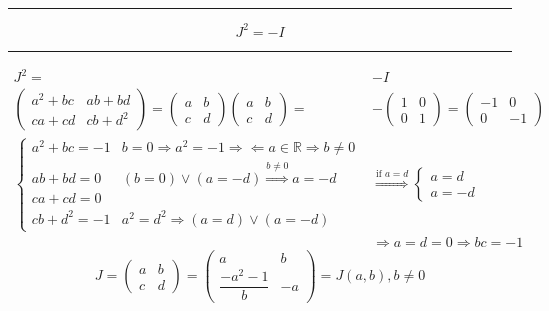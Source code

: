 \documentclass[
]{book}
\theoremstyle{definition}
\theoremstyle{definition}
\theoremstyle{definition}
\theoremstyle{definition}
\theoremstyle{remark}
\begin{document}
\begin{center}\rule{0.5\linewidth}{0.5pt}\end{center}

\[
J^{2}=-I
\]

\begin{center}\rule{0.5\linewidth}{0.5pt}\end{center}

\[
\begin{aligned}
J^{2}= & -I\\
\begin{pmatrix}a^{2}+bc & ab+bd\\
ca+cd & cb+d^{2}
\end{pmatrix}=\begin{pmatrix}a & b\\
c & d
\end{pmatrix}\begin{pmatrix}a & b\\
c & d
\end{pmatrix}= & -\begin{pmatrix}1 & 0\\
0 & 1
\end{pmatrix}=\begin{pmatrix}-1 & 0\\
0 & -1
\end{pmatrix}\\
\begin{cases}
a^{2}+bc=-1 & b=0\Rightarrow a^{2}=-1\Rightarrow\Leftarrow a\in\mathbb{R}\Rightarrow b\ne0\\
ab+bd=0 & \left(b=0\right)\vee\left(a=-d\right)\overset{b\ne0}{\Rightarrow}a=-d\\
ca+cd=0\\
cb+d^{2}=-1 & a^{2}=d^{2}\Rightarrow\left(a=d\right)\vee\left(a=-d\right)
\end{cases} & \overset{\text{if }a=d}{\Rightarrow}\begin{cases}
a=d\\
a=-d
\end{cases}\\
 & \Rightarrow a=d=0\Rightarrow bc=-1
\end{aligned}
\]
\[
J=\begin{pmatrix}a & b\\
c & d
\end{pmatrix}=\begin{pmatrix}a & b\\
\dfrac{-a^{2}-1}{b} & -a
\end{pmatrix}=J\left(a,b\right),b\ne0
\]
\end{document}
